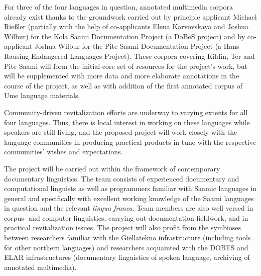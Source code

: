 \documentclass[a4paper,12pt]{article}
\begin{document}
For three of the four languages in question, annotated multimedia corpora already exist thanks to the groundwork carried out by principle applicant Michael Rießler (partially with the help of co-applicants Elena Karvovskaya and Joshua Wilbur) %
for the Kola Saami Documentation Project (a DoBeS project) and by co-applicant Joshua Wilbur for the Pite Saami Documentation Project (a Hans Rausing Endangered Languages Project). %
These corpora covering Kildin, Ter and Pite Saami will form the initial core set of resources for the project's work, but will be supplemented with more data and more elaborate annotations in the course of the project, as well as with addition of the first annotated corpus of Ume language materials.

Community-driven revitalization efforts are underway to varying extents for all four languages. Thus, there is local interest in working on these languages while speakers are still living, and the proposed project will work closely with the language communities in producing practical products in tune with the respective communities' wishes and expectations.


The project will be carried out within the framework of contemporary documentary linguistics. The team consists of experienced documentary and computational linguists as well as programmers familiar with Saamic languages in general and specifically with excellent working knowledge of the Saami languages in question and the relevant \textit{lingua franca}. Team members are also well versed in corpus- and computer linguistics, carrying out documentation fieldwork, and in practical revitalization issues. The project will also profit from the symbioses between researchers familiar with the Giellatekno infrastructure (including tools for other northern languages) and researchers acquainted with the DOBES and ELAR infrastructures (documentary linguistics of spoken language, archiving of annotated multimedia).
\end{document}
